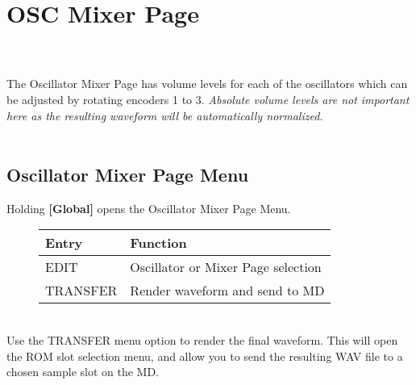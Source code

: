 \section{OSC Mixer Page}
\\\\
The Oscillator Mixer Page has volume levels for each of the oscillators which can be adjusted by rotating encoders 1 to 3. \textit{Absolute volume levels are not important here as the resulting waveform will be automatically normalized.}\\
\\
\subsection{Oscillator Mixer Page Menu}
Holding \textbf{[Global]} opens the Oscillator Mixer Page Menu.
\begin{figure}[hb]
    \begin{tabular}{|l|l|}
    \hline
    \rowcolor[HTML]{C0C0C0}
    Entry     & Function \\ \hline
    EDIT      & Oscillator or Mixer Page selection \\ \hline
    TRANSFER  & Render waveform and send to MD\\ \hline
    \end{tabular}
\end{figure}
\\
Use the TRANSFER menu option to render the final waveform. This will open the ROM slot selection menu, and allow you to send the resulting WAV file to a chosen sample slot on the MD.